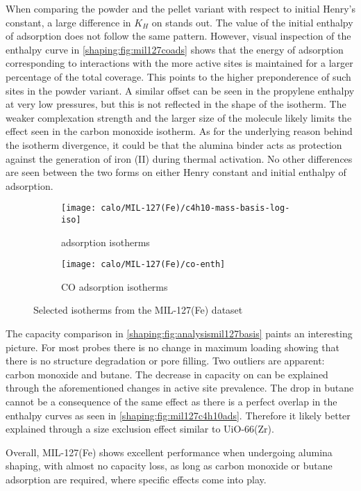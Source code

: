 When comparing the powder and the pellet variant with respect to
initial Henry's constant, a large difference in \(K_H\) on 
stands out. The value of the initial enthalpy of adsorption
does not follow the same pattern.
However, visual inspection of the enthalpy curve in
\autoref{shaping:fig:mil127coads} shows that the energy of
adsorption corresponding to
interactions with the more active sites is maintained for a larger
percentage of the total coverage.
This points to the higher preponderence of such sites in the powder
variant. A similar offset can be seen in the propylene enthalpy at very
low pressures, but this is not reflected in the shape of the isotherm.
The weaker complexation strength and the larger size of the molecule
likely limits the effect seen in the carbon monoxide isotherm.
As for the underlying reason behind the isotherm divergence, it
could be that the alumina binder acts as protection against the
generation of iron (II) during thermal activation.
No other differences are seen between the two forms on either Henry
constant and initial enthalpy of adsorption.

\begin{figure}[!htb]
	\centering
	\begin{subfigure}{0.45\textwidth}
		\texttt{[image: calo/MIL-127(Fe)/c4h10-mass-basis-log-iso]}
		\caption{ adsorption isotherms}%
		\label{shaping:fig:mil127c4h10ads}
	\end{subfigure}%
	\begin{subfigure}{0.45\textwidth}
		\texttt{[image: calo/MIL-127(Fe)/co-enth]}
		\caption{CO adsorption isotherms}%
		\label{shaping:fig:mil127coads}
	\end{subfigure}%
	\caption{Selected isotherms from the MIL-127(Fe) dataset}%
	\label{shaping:fig:mil127isotherms}
\end{figure}

The capacity comparison in \autoref{shaping:fig:analysismil127basis}
paints an interesting picture. For most probes there is no change in
maximum loading showing that there is no structure degradation or
pore filling. Two outliers are apparent: carbon monoxide and
butane. The decrease in capacity on  can be explained through the
aforementioned changes in active site prevalence.
The drop in butane cannot be a consequence of the same effect
as there is a perfect overlap in the enthalpy curves as seen in
\autoref{shaping:fig:mil127c4h10ads}.
Therefore it likely better explained through a size exclusion
effect similar to UiO-66(Zr).

Overall, MIL-127(Fe) shows excellent performance when undergoing
alumina shaping, with almost no capacity loss, as long as
carbon monoxide or butane adsorption are required, where specific effects
come into play.
